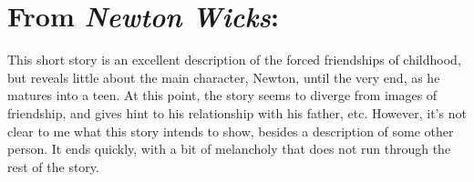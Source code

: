 \documentclass[letterpaper]{article}
\begin{document}
   \section{From \emph{Newton Wicks}:}
   This short story is an excellent description of the forced friendships of childhood, but reveals little about the main character, Newton, until the very end, as he matures into a teen. At this point, the story seems to diverge from images of friendship, and gives hint to his relationship with his father, etc. However, it's not clear to me what this story intends to show, besides a description of some other person. It ends quickly, with a bit of melancholy that does not run through the rest of the story.

   
\end{document}
